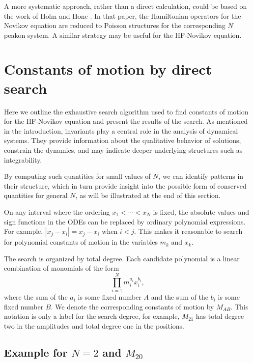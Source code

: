 \documentclass[english,master]{liumaiex}
\theoremstyle{thesisplain}
\theoremstyle{thesisdefinition}
\numberwithin{equation}{section}
\begin{document}
A more systematic approach, rather than a direct calculation, could be based on the work of Holm and Hone \cite{Holm_2005}. In that paper, the Hamiltonian operators for the Novikov equation are reduced to Poisson structures for the corresponding $N$ peakon system. A similar strategy may be useful for the HF-Novikov equation.
\section{Constants of motion by direct search} \label{sec:direct-search}

Here we outline the exhaustive search algorithm used to find constants of motion for the HF-Novikov equation and present the results of the search. As mentioned in the introduction, invariants play a central role in the analysis of dynamical systems. They provide information about the qualitative behavior of solutions, constrain the dynamics, and may indicate deeper underlying structures such as integrability.

By computing such quantities for small values of $N$, we can identify patterns in their structure, which in turn provide insight into the possible form of conserved quantities for general $N$, as will be illustrated at the end of this section.

On any interval where the ordering $x_1<\cdots<x_N$ is fixed, the absolute values and sign functions in the ODEs can be replaced by ordinary polynomial expressions. For example, $|x_j-x_i|=x_j-x_i$ when $i<j$. This makes it reasonable to search for polynomial constants of motion in the variables $m_k$ and $x_k$.

The search is organized by total degree. Each candidate polynomial is a linear combination of monomials of the form
\begin{equation}
	\prod_{i=1}^{N} m_i^{a_i} x_i^{b_i},
\end{equation} 
where the sum of the $a_i$ is some fixed number $A$ and the sum of the $b_i$ is some fixed number $B$. We denote the corresponding constants of motion by $M_{AB}$. This notation is only a label for the search degree, for example, $M_{21}$ has total degree two in the amplitudes and total degree one in the positions.

\subsection*{Example for $N = 2$ and $M_{20}$}
\end{document}
